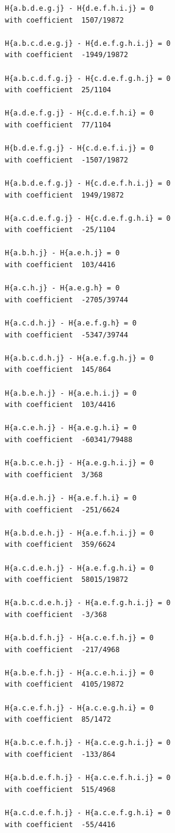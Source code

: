 \documentclass[11pt, a4paper]{kybernetika}
\begin{document}
\begin{verbatim}
		H{a.b.d.e.g.j} - H{d.e.f.h.i.j} = 0
		with coefficient  1507/19872
		
		H{a.b.c.d.e.g.j} - H{d.e.f.g.h.i.j} = 0
		with coefficient  -1949/19872
		
		H{a.b.c.d.f.g.j} - H{c.d.e.f.g.h.j} = 0
		with coefficient  25/1104
		
		H{a.d.e.f.g.j} - H{c.d.e.f.h.i} = 0
		with coefficient  77/1104
		
		H{b.d.e.f.g.j} - H{c.d.e.f.i.j} = 0
		with coefficient  -1507/19872
		
		H{a.b.d.e.f.g.j} - H{c.d.e.f.h.i.j} = 0
		with coefficient  1949/19872
		
		H{a.c.d.e.f.g.j} - H{c.d.e.f.g.h.i} = 0
		with coefficient  -25/1104
		
		H{a.b.h.j} - H{a.e.h.j} = 0
		with coefficient  103/4416
		
		H{a.c.h.j} - H{a.e.g.h} = 0
		with coefficient  -2705/39744
		
		H{a.c.d.h.j} - H{a.e.f.g.h} = 0
		with coefficient  -5347/39744
		
		H{a.b.c.d.h.j} - H{a.e.f.g.h.j} = 0
		with coefficient  145/864
		
		H{a.b.e.h.j} - H{a.e.h.i.j} = 0
		with coefficient  103/4416
		
		H{a.c.e.h.j} - H{a.e.g.h.i} = 0
		with coefficient  -60341/79488
		
		H{a.b.c.e.h.j} - H{a.e.g.h.i.j} = 0
		with coefficient  3/368
		
		H{a.d.e.h.j} - H{a.e.f.h.i} = 0
		with coefficient  -251/6624
		
		H{a.b.d.e.h.j} - H{a.e.f.h.i.j} = 0
		with coefficient  359/6624
		
		H{a.c.d.e.h.j} - H{a.e.f.g.h.i} = 0
		with coefficient  58015/19872
		
		H{a.b.c.d.e.h.j} - H{a.e.f.g.h.i.j} = 0
		with coefficient  -3/368
		
		H{a.b.d.f.h.j} - H{a.c.e.f.h.j} = 0
		with coefficient  -217/4968
		
		H{a.b.e.f.h.j} - H{a.c.e.h.i.j} = 0
		with coefficient  4105/19872
		
		H{a.c.e.f.h.j} - H{a.c.e.g.h.i} = 0
		with coefficient  85/1472
		
		H{a.b.c.e.f.h.j} - H{a.c.e.g.h.i.j} = 0
		with coefficient  -133/864
		
		H{a.b.d.e.f.h.j} - H{a.c.e.f.h.i.j} = 0
		with coefficient  515/4968
		
		H{a.c.d.e.f.h.j} - H{a.c.e.f.g.h.i} = 0
		with coefficient  -55/4416
		

\end{verbatim}
\end{document}
